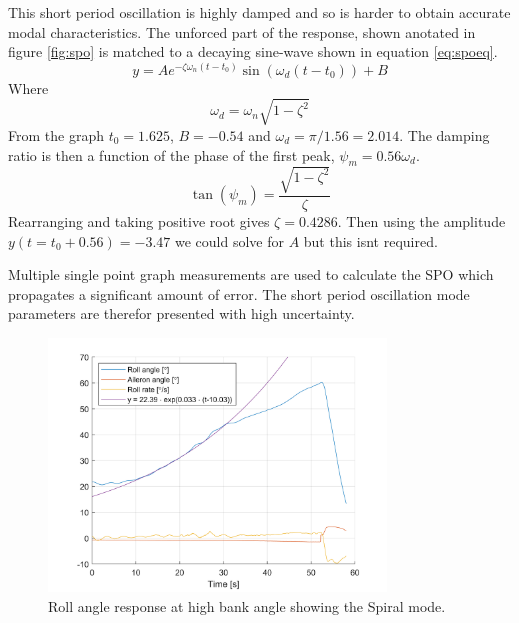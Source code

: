 \documentclass{article}
\begin{document}
This short period oscillation is highly damped and so is harder to obtain accurate modal characteristics.
The unforced part of the response, shown anotated in figure \ref{fig:spo} is matched to a decaying sine-wave shown in equation \ref{eq:spoeq}.
\begin{equation}
  y = Ae^{-\zeta\omega_{n}(t - t_{0})}\sin(\omega_{d}(t - t_{0})) + B
  \label{eq:spoeq}
\end{equation}
Where
\begin{equation}
  \omega_{d} = \omega_{n}\sqrt{1 - \zeta^{2}}
\end{equation}
From the graph $t_0 = 1.625$, $B=-0.54$ and $\omega_d = \pi/1.56 = 2.014$.
The damping ratio is then a function of the phase of the first peak, $\psi_m = 0.56\omega_d$.
\begin{equation}
  \tan(\psi_m) = \frac{\sqrt{1-\zeta^2}}{\zeta}
\end{equation}
Rearranging and taking positive root gives $\zeta= 0.4286$.
Then using the amplitude $y(t=t_0 + 0.56) = -3.47$ we could solve for $A$ but this isnt required.

Multiple single point graph measurements are used to calculate the SPO which propagates a significant amount of error.
The short period oscillation mode parameters are therefor presented with high uncertainty.

\begin{figure}[H]
  \centering
  \includegraphics[width=0.8\textwidth]{figures/Spiral.png}
  \caption{Roll angle response at high bank angle showing the Spiral mode.}
  \label{fig:spiral}
\end{figure}
\end{document}
